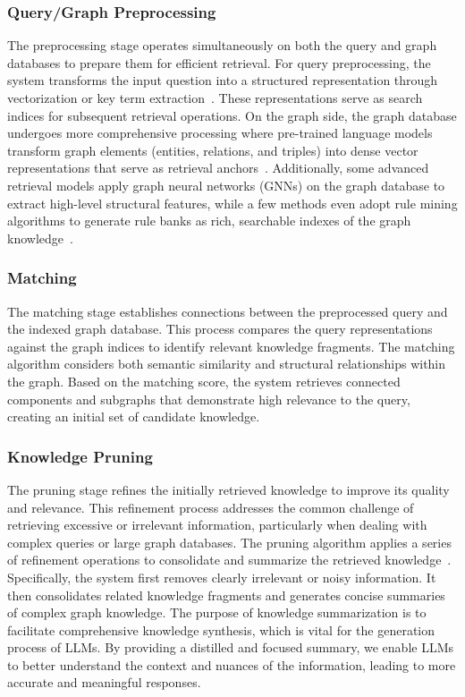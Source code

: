 \documentclass[lettersize,journal]{IEEEtran}
\begin{document}
\subsubsection{Query/Graph Preprocessing}
The preprocessing stage operates simultaneously on both the query and graph databases to prepare them for efficient retrieval. For query preprocessing, the system transforms the input question into a structured representation through vectorization or key term extraction~\cite{zhu2024structugraphrag,gubanov2024cancerkg,liu2024graphcoder}. These representations serve as search indices for subsequent retrieval operations. On the graph side, the graph database undergoes more comprehensive processing where pre-trained language models transform graph elements (entities, relations, and triples) into dense vector representations that serve as retrieval anchors~\cite{he2024g,wang2024knowledge,he2024enhancing,ma2024think-on-graph-2.0}. Additionally, some advanced retrieval models apply graph neural networks (GNNs) on the graph database to extract high-level structural features, while a few methods even adopt rule mining algorithms to generate rule banks as rich, searchable indexes of the graph knowledge~\cite{li2024graph,kang2023knowledge,sun2024thinkongraph,chen2024rulerag}.

\subsubsection{Matching}
The matching stage establishes connections between the preprocessed query and the indexed graph database. This process compares the query representations against the graph indices to identify relevant knowledge fragments. The matching algorithm considers both semantic similarity and structural relationships within the graph. Based on the matching score, the system retrieves connected components and subgraphs that demonstrate high relevance to the query, creating an initial set of candidate knowledge.

\subsubsection{Knowledge Pruning}
The pruning stage refines the initially retrieved knowledge to improve its quality and relevance. This refinement process addresses the common challenge of retrieving excessive or irrelevant information, particularly when dealing with complex queries or large graph databases. The pruning algorithm applies a series of refinement operations to consolidate and summarize the retrieved knowledge~\cite{he2024g,Zhang-etal24KnowGPT,liang2024empowering}. Specifically, the system first removes clearly irrelevant or noisy information. It then consolidates related knowledge fragments and generates concise summaries of complex graph knowledge. The purpose of knowledge summarization is to facilitate comprehensive knowledge synthesis, which is vital for the generation process of LLMs. By providing a distilled and focused summary, we enable LLMs to better understand the context and nuances of the information, leading to more accurate and meaningful responses.
\end{document}
